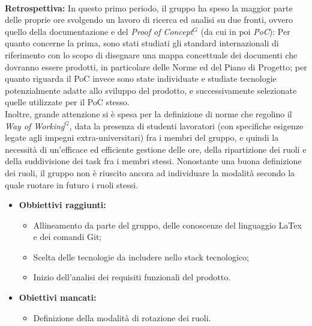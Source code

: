 \paragraph{}
\textbf{Retrospettiva:}
In questo primo periodo, il gruppo ha speso la maggior parte delle proprie ore svolgendo un lavoro di ricerca ed analisi
su due fronti, ovvero quello della documentazione e del \emph{Proof of Concept}$^{G}$ (da cui in poi \emph{PoC}): Per quanto concerne la prima, sono stati studiati gli standard internazionali di riferimento
con lo scopo di disegnare una mappa concettuale dei documenti che dovranno essere prodotti, in particolare delle Norme ed del Piano di Progetto; per quanto
riguarda il PoC invece sono state individuate e studiate tecnologie potenzialmente adatte allo sviluppo del prodotto, e successivamente selezionate quelle utilizzate per il PoC stesso. \\
Inoltre, grande attenzione si è spesa per la definizione di norme che regolino il \emph{Way of Working}$^{G}$, data la presenza di studenti lavoratori (con
specifiche esigenze legate agli impegni extra-universitari) fra i membri del gruppo, e quindi la necessità di un'efficace ed efficiente gestione delle ore, della ripartizione dei ruoli
e della suddivisione dei task fra i membri stessi. Nonostante una buona definizione dei ruoli, il gruppo non è riuscito ancora ad individuare la modalità secondo la quale
ruotare in futuro i ruoli stessi.
\begin{itemize}
    \item \textbf{Obbiettivi raggiunti:}
    \begin{itemize}
        \item Allineamento da parte del gruppo, delle conoscenze del linguaggio LaTex e dei comandi Git;
        \item Scelta delle tecnologie da includere nello stack tecnologico;
        \item Inizio dell'analisi dei requisiti funzionali del prodotto.
    \end{itemize}\pagebreak
    \item \textbf{Obiettivi mancati:}
    \begin{itemize}
        \item Definizione della modalità di rotazione dei ruoli.
    \end{itemize}
\end{itemize}

